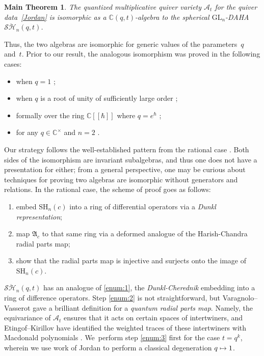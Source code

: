 \documentclass[11pt]{article}
\newcommand\mto{\mathchoice{\longmapsto}{\mapsto}{\mapsto}{\mapsto}}
\newcommand{\GL}{\mathrm{GL}}
\newcommand{\SH}{\mathrm{SH}}
\newtheorem*{main}{Main Theorem}
\theoremstyle{definition}
\newcommand{\CC}{\mathbb{C}}
\newcommand{\SHH}{\mathcal{S}\ddot{\mathcal{H}}}
\begin{document}
\begin{main}
The quantized multiplicative quiver variety $\mathcal{A}_t$ for the quiver data~\eqref{Jordan} is isomorphic as a $\CC(q,t)$-algebra to the spherical $\GL_n$-DAHA $\SHH_n(q,t)$.
\end{main}

Thus, the two algebras are isomorphic for generic values of the parameters~$q$ and~$t$.
Prior to our result, the analogous isomorphism was proved in the following cases:
\begin{itemize}
\item when $q=1$ \cite{ObDAHA};
\item when $q$ is a root of unity of sufficiently large order \cite{VarVassRoot};
\item formally over the ring $\CC[\![\hbar]\!]$ where $q=e^\hbar$ \cite{JordanMult};
\item for any $q\in\CC^\times$ and $n=2$ \cite{BalJor}.
\end{itemize}

Our strategy follows the well-established pattern from the rational case \cite{GanGinz, EGGO}.
Both sides of the isomorphism are invariant subalgebras, and thus one does not have a presentation for either; from a general perspective, one may be curious about techniques for proving two algebras are isomorphic without generators and relations.
In the rational case, the scheme of proof goes as follows:
\begin{enumerate}
\item\label{enum:1} embed $\SH_n(c)$ into a ring of differential operators via a \textit{Dunkl representation};
\item\label{enum:2} map $\mathfrak{A}_c$ to that same ring via a deformed analogue of the Harish-Chandra radial parts map;
\item\label{enum:3} show that the radial parts map is injective and surjects onto the image of $\SH_n(c)$.
\end{enumerate}
$\SHH_n(q,t)$ has an analogue of \eqref{enum:1}, the \textit{Dunkl-Cherednik} embedding into a ring of difference operators.
Step \eqref{enum:2} is not straightforward, but Varagnolo--Vasserot \cite{VarVassRoot} gave a brilliant definition for a \textit{quantum radial parts map}.
Namely, the equivariance of $\mathcal{A}_t$ ensures that it acts on certain spaces of intertwiners, and Etingof--Kirillov have identified the weighted traces of these intertwiners with Macdonald polynomials \cite{EtKirQuant}. We~perform step \eqref{enum:3} first for the case $t=q^k$, wherein we use work of Jordan \cite{JordanMult} to perform a classical degeneration $q\mto 1$.
\end{document}
